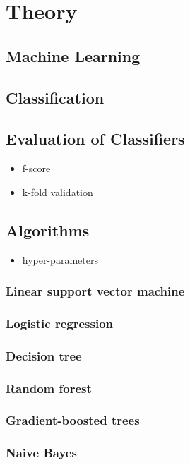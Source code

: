 \chapter{Theory}
\section{Machine Learning}
\section{Classification}
\section{Evaluation of Classifiers}
\begin{itemize}
\item{f-score}
\item{k-fold validation}
\end{itemize}
\section{Algorithms}
\begin{itemize}
\item{hyper-parameters}
\end{itemize}
\subsection{Linear support vector machine}
\subsection{Logistic regression}
\subsection{Decision tree}
\subsection{Random forest}
\subsection{Gradient-boosted trees}
\subsection{Naive Bayes}